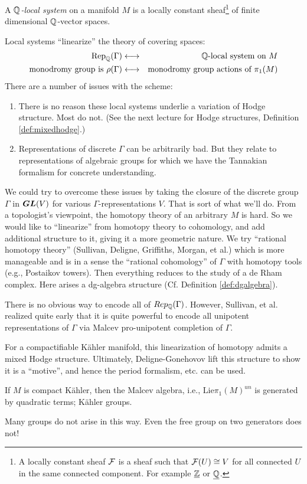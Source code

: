 \begin{defn}
A \emph{$\mathbb{Q}$-local system} on a manifold $M$ is a locally constant sheaf\footnote{A locally constant sheaf $\mathcal{F}$ is a sheaf such that $\mathcal{F}(U) \cong V$ for all connected $U$ in the same connected component. For example $\underline{\mathbb{Z}}$ or $\underline{\mathbb{Q}}$.} of finite dimensional $\mathbb{Q}$-vector spaces.
\end{defn}
\noindent Local systems ``linearize'' the theory of covering spaces:
\begin{eqnarray*}
\mathrm{Rep}_{\mathbb{Q}}(\Gamma) & \longleftrightarrow & \textrm{$\mathbb{Q}$-local system on $M$} \\
\textrm{monodromy group is $\rho(\Gamma)$} & \longleftrightarrow & \textrm{monodromy group actions of $\pi_1(M)$}
\end{eqnarray*}
There are a number of issues with the scheme:
\begin{enumerate}
\item There is no reason these local systems underlie a variation of Hodge structure. Most do not. (See the next lecture for Hodge structures, Definition \ref{def:mixedhodge}.)
\item Representations of discrete $\Gamma$ can be arbitrarily bad. But they relate to representations of algebraic groups for which we have the Tannakian formalism for concrete understanding.
\end{enumerate}
We could try to overcome these issues by taking the closure of the discrete group $\Gamma$ in $\boldsymbol{GL}(V)$ for various $\Gamma$-representations $V$. That is sort of what we'll do. From a topologist's viewpoint, the homotopy theory of an arbitrary $M$ is hard. So we would like to ``linearize'' from homotopy theory to cohomology, and add additional structure to it, giving it a more geometric nature. We try ``rational homotopy theory'' (Sullivan, Deligne, Griffiths, Morgan, et al.) which is more manageable and is in a sense the ``rational cohomology'' of $\Gamma$ with homotopy tools (e.g., Postaikov towers). Then everything reduces to the study of a de Rham complex. Here arises a dg-algebra structure (Cf. Definition \ref{def:dgalgebra}).

There is no obvious way to encode all of $Rep_{\mathbb{Q}}(\Gamma)$. However, Sullivan, et al. realized quite early that it is quite powerful to encode all unipotent representations of $\Gamma$ via Malcev pro-unipotent completion of $\Gamma$.

\begin{rem} 
For a compactifiable K\"ahler manifold, this linearization of homotopy admits a mixed Hodge structure. Ultimately, Deligne-Gonehovov lift this structure to show it is a ``motive'', and hence the period formalism, etc. can be used.
\end{rem}
\begin{prop}[Morgan]
If $M$ is compact K\"ahler, then the Malcev algebra, i.e., $\mathrm{Lie} \pi_1(M)^{un}$ is generated by quadratic terms; K\"ahler groups.
\end{prop}
\noindent Many groups do not arise in this way. Even the free group on two generators does not!

